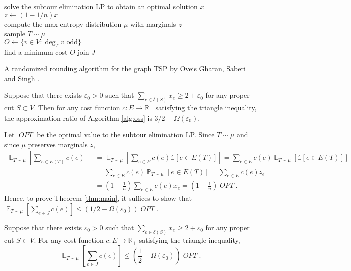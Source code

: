 \documentclass[letterpaper, reqno,12pt]{article}
\newcommand{\RR}{\mathbb{R}}
\newcommand{\PP}{\mathop{{}\mathbb{P}}}
\newcommand{\EE}{\mathop{{}\mathbb{E}}}
\DeclareMathOperator{\OPT}{\mathit{OPT}}
\begin{document}
\begin{algorithm}
  solve the subtour elimination LP to obtain an optimal solution $x$ \\
  $z \leftarrow (1 - 1/n) x$ \\
  compute the max-entropy distribution $\mu$ with marginals $z$  \\
  sample $T \sim \mu$ \\
  $O \leftarrow \{ v \in V: \deg_T v \text{ odd} \}$ \\
  find a minimum cost $O$-join $J$  \\
  \caption{A randomized rounding algorithm for the graph TSP by Oveis Gharan, Saberi and Singh \cite{gharan2011randomized}.}
  \label{alg:oss}
\end{algorithm}

\begin{theorem} \label{thm:main}
  Suppose that there exists $\varepsilon_0 > 0$ such that $\sum_{e \in \delta(S)} x_e \geq 2 + \varepsilon_0$ for any proper cut $S \subset V$. Then for any cost function $c : E \to \RR_+$ satisfying the triangle inequality, the approximation ratio of Algorithm \ref{alg:oss} is $3/2 - \Omega(\varepsilon_0)$.
\end{theorem}

Let $\OPT$ be the optimal value to the subtour elimination LP. Since $T \sim \mu$ and since $\mu$ preserves marginals $z$,
\begin{align*}
  \EE_{T \sim \mu}\left[\sum_{e \in E(T)} c(e)\right] &= \EE_{T \sim \mu}\left[\sum_{e \in E} c(e) \mathds 1[e \in E(T)]\right] = \sum_{e \in E} c(e) \EE_{T \sim \mu}[\mathds 1[e \in E(T)]] \\
  &= \sum_{e \in E} c(e) \PP_{T \sim \mu}[e \in E(T)] = \sum_{e \in E} c(e) z_e \\
  &= \left(1 - \frac{1}{n}\right) \sum_{e \in E} c(e) x_e = \left(1 - \frac{1}{n}\right) \OPT.
\end{align*}
Hence, to prove Theorem \ref{thm:main}, it suffices to show that $\EE_{T \sim \mu}[\sum_{e \in J} c(e)] \leq (1/2 - \Omega(\varepsilon_0)) \OPT$.

\begin{theorem} \label{thm:o-join}
  Suppose that there exists $\varepsilon_0 > 0$ such that $\sum_{e \in \delta(S)} x_e \geq 2 + \varepsilon_0$ for any proper cut $S \subset V$. For any cost function $c : E \to \RR_+$ satisfying the triangle inequality,
  $$ \EE_{T \sim \mu}\left[\sum_{e \in J} c(e)\right] \leq \left(\frac{1}{2} - \Omega\left(\varepsilon_0\right)\right) \OPT. $$
\end{theorem}
\end{document}
